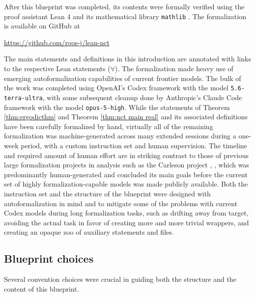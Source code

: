 \documentclass[12pt,reqno]{amsart}
\theoremstyle{plain}
\numberwithin{equation}{section}
\theoremstyle{remark}
\begin{document}
After this blueprint was completed, its contents were formally verified using the proof assistant Lean 4 \cite{LeanPaper} and its mathematical library \texttt{mathlib} \cite{Mathlib}. The formalization is available on GitHub at 
\begin{center}
\href{https://github.com/roos-j/lean-nct}{https://github.com/roos-j/lean-nct}
\end{center}
The main statements and definitions in this introduction are annotated with links to the respective Lean statements (\ensuremath{\forall}). 
The formalization made heavy use of emerging autoformalization capabilities of current frontier models. The bulk of the work was completed using OpenAI's Codex framework with the model \texttt{5.6-terra-ultra}, with some subsequent cleanup done by Anthropic's Claude Code framework with the model \texttt{opus-5-high}. While the statements of Theorem \ref{thm:ergodicthm} and Theorem \ref{thm:nct main real} and its associated definitions have been carefully formalized by hand, virtually all of the remaining formalization was machine-generated across many extended sessions during a one-week period, with a custom instruction set and human supervision. The timeline and required amount of human effort are in striking contrast to those of previous large formalization projects in analysis such as the Carleson project \cite{CarlesonBlueprint}, \cite{CarlesonPaper}, which was predominantly human-generated and concluded its main goals before the current set of highly formalization-capable models was made publicly available.
Both the instruction set and the structure of the blueprint were designed with autoformalization in mind and to mitigate some of the problems with current Codex models during long formalization tasks, such as drifting away from target, avoiding the actual task in favor of creating more and more trivial wrappers, and creating an opaque zoo of auxiliary statements and files.


\subsection{Blueprint choices}
Several convention choices were crucial in guiding both the structure and the content of this blueprint.
\end{document}
